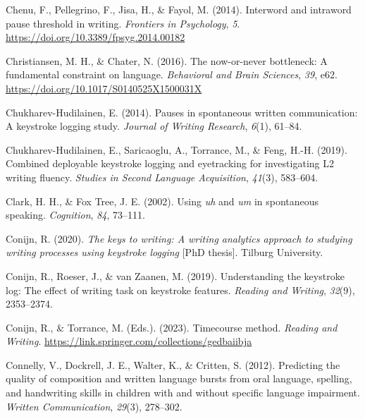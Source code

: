 \documentclass[
  man,floatsintext]{apa7}
\newlength{\cslhangindent}
\newlength{\cslentryspacingunit} %
\newenvironment{CSLReferences}[2] %
 {%
  \setlength{\parindent}{0pt}
  \ifodd #1
  \let\oldpar\par
  \def\par{\hangindent=\cslhangindent\oldpar}
  \fi
  \setlength{\parskip}{#2\cslentryspacingunit}
 }%
 {}
\begin{document}
\begin{CSLReferences}{1}{0}
\leavevmode{}%
Chenu, F., Pellegrino, F., Jisa, H., \& Fayol, M. (2014). Interword and intraword pause threshold in writing. \emph{Frontiers in Psychology}, \emph{5}. \url{https://doi.org/10.3389/fpsyg.2014.00182}

\leavevmode{}%
Christiansen, M. H., \& Chater, N. (2016). The now-or-never bottleneck: A fundamental constraint on language. \emph{Behavioral and Brain Sciences}, \emph{39}, e62. \url{https://doi.org/10.1017/S0140525X1500031X}

\leavevmode{}%
Chukharev-Hudilainen, E. (2014). Pauses in spontaneous written communication: {A} keystroke logging study. \emph{Journal of Writing Research}, \emph{6}(1), 61--84.

\leavevmode{}%
Chukharev-Hudilainen, E., Saricaoglu, A., Torrance, M., \& Feng, H.-H. (2019). Combined deployable keystroke logging and eyetracking for investigating {L2} writing fluency. \emph{Studies in Second Language Acquisition}, \emph{41}(3), 583--604.

\leavevmode{}%
Clark, H. H., \& Fox Tree, J. E. (2002). Using \emph{uh} and \emph{um} in spontaneous speaking. \emph{Cognition}, \emph{84}, 73--111.

\leavevmode{}%
Conijn, R. (2020). \emph{The keys to writing: A writing analytics approach to studying writing processes using keystroke logging} {[}PhD thesis{]}. Tilburg University.

\leavevmode{}%
Conijn, R., Roeser, J., \& van Zaanen, M. (2019). Understanding the keystroke log: The effect of writing task on keystroke features. \emph{Reading and Writing}, \emph{32}(9), 2353--2374.

\leavevmode{}%
Conijn, R., \& Torrance, M. (Eds.). (2023). Timecourse method. \emph{Reading and Writing}. \url{https://link.springer.com/collections/gedbaiibja}

\leavevmode{}%
Connelly, V., Dockrell, J. E., Walter, K., \& Critten, S. (2012). Predicting the quality of composition and written language bursts from oral language, spelling, and handwriting skills in children with and without specific language impairment. \emph{Written Communication}, \emph{29}(3), 278--302.


\end{CSLReferences}
\end{document}
